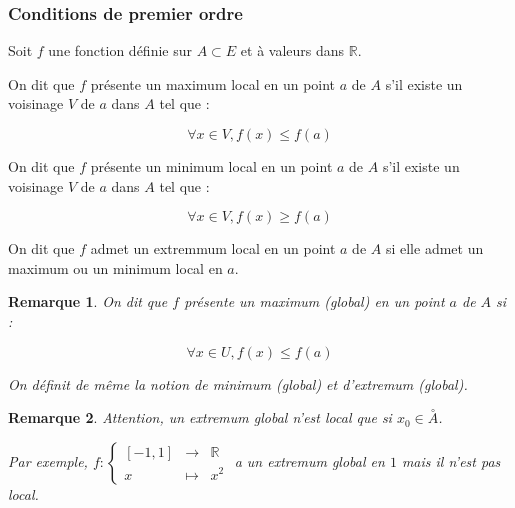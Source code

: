 \documentclass[a4paper,12pt]{book}
\newcommand{\Def}[2]{\begin{tcolorbox}[sharp corners, colback=white,colframe=blue!90!black!75, title=Définition : #1]#2\end{tcolorbox}}
\newtheorem{Rem}{Remarque}[section]
\def\R{\mathbb{R}}
\begin{document}
\subsubsection{Conditions de premier ordre}
\Def{}{Soit $f$ une fonction définie sur $A\subset E$ et à valeurs dans $\R$.
\par On dit que $f$ présente un maximum local en un point $a$ de $A$ s'il existe un voisinage $V$ de $a$ dans $A$ tel que :
\par $$\forall x\in V, f(x)\leq f(a)$$
\par On dit que $f$ présente un minimum local en un point $a$ de $A$ s'il existe un voisinage $V$ de $a$ dans $A$ tel que :
\par $$\forall x\in V, f(x)\geq f(a)$$
\par On dit que $f$ admet un extremmum local en un point $a$ de $A$ si elle admet un maximum ou un minimum local en $a$.}
\begin{Rem}
On dit que $f$ présente un maximum (global) en un point $a$ de $A$ si :
\par $$\forall x\in U, f(x)\leq f(a)$$
\par On définit de même la notion de minimum (global) et d'extremum (global). 
\end{Rem}
\begin{Rem}
Attention, un extremum global n'est local que si $x_0\in\overset{\circ}{A}$.
\par Par exemple, $f:\left\{\begin{array}{rcl}[-1, 1] & \to & \R \\ x & \mapsto & x^2\end{array}\right.$ a un extremum global en $1$ mais il n'est pas local.
\end{Rem}
\end{document}
